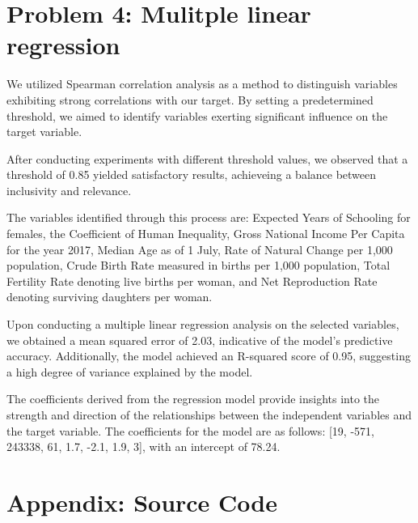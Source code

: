 \documentclass[a4paper]{article}
\begin{document}
\section*{Problem 4: Mulitple linear regression}

We utilized Spearman correlation analysis as a method to distinguish variables exhibiting strong correlations with our target. 
By setting a predetermined threshold, we aimed to identify variables exerting significant influence on the target variable.

After conducting experiments with different threshold values, we observed that a threshold of 0.85 yielded satisfactory results, achieveing a balance between inclusivity and relevance.

The variables identified through this process are: Expected Years of Schooling for females, the Coefficient of Human Inequality, Gross National Income Per Capita for the year 2017, Median Age as of 1 July, Rate of Natural Change per 1,000 population, Crude Birth Rate measured in births per 1,000 population, Total Fertility Rate denoting live births per woman, and Net Reproduction Rate denoting surviving daughters per woman.

Upon conducting a multiple linear regression analysis on the selected variables, we obtained a mean squared error of 2.03, indicative of the model's predictive accuracy. 
Additionally, the model achieved an R-squared score of 0.95, suggesting a high degree of variance explained by the model.

The coefficients derived from the regression model provide insights into the strength and direction of the relationships between the independent variables and the target variable.
The coefficients for the model are as follows: [19, -571, 243338, 61, 1.7, -2.1, 1.9, 3], with an intercept of 78.24.




\newpage


\printbibliography

\section*{Appendix: Source Code}




\end{document}
